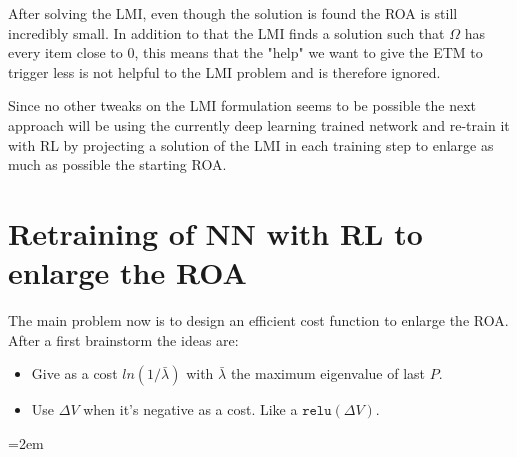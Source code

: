 \documentclass{article}
\begin{document}
After solving the LMI, even though the solution is found the ROA is still incredibly small. In addition to that the LMI finds a solution such that $\Omega$ has every item close to 0, this means that the "help" we want to give the ETM to trigger less is not helpful to the LMI problem and is therefore ignored. 

Since no other tweaks on the LMI formulation seems to be possible the next approach will be using the currently deep learning trained network and re-train it with RL by projecting a solution of the LMI in each training step to enlarge as much as possible the starting ROA. 

\section*{Retraining of NN with RL to enlarge the ROA}
The main problem now is to design an efficient cost function to enlarge the ROA. After a first brainstorm the ideas are:
\begin{itemize}
  \item Give as a cost $ln(1/\bar{\lambda})$ with $\bar{\lambda}$ the maximum eigenvalue of last $P$. 
  \item Use $\Delta V$ when it's negative as a cost. Like a $\texttt{relu}(\Delta V)$.
\end{itemize}



\pagebreak
\emergencystretch=2em %
\printbibliography
\end{document}
